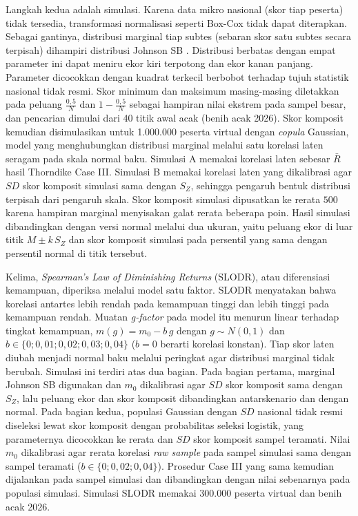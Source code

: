 Langkah kedua adalah simulasi. Karena data mikro nasional (skor tiap peserta) tidak tersedia, transformasi normalisasi seperti Box-Cox tidak dapat diterapkan. Sebagai gantinya, distribusi marginal tiap subtes (sebaran skor satu subtes secara terpisah) dihampiri distribusi Johnson SB \autocite{johnson1949}. Distribusi berbatas dengan empat parameter ini dapat meniru ekor kiri terpotong dan ekor kanan panjang. Parameter dicocokkan dengan kuadrat terkecil berbobot terhadap tujuh statistik nasional tidak resmi. Skor minimum dan maksimum masing-masing diletakkan pada peluang $\frac{0,5}{N}$ dan $1 - \frac{0,5}{N}$ sebagai hampiran nilai ekstrem pada sampel besar, dan pencarian dimulai dari 40 titik awal acak (benih acak 2026). Skor komposit kemudian disimulasikan untuk 1.000.000 peserta virtual dengan \textit{copula} Gaussian, model yang menghubungkan distribusi marginal melalui satu korelasi laten seragam pada skala normal baku. Simulasi A memakai korelasi laten sebesar $\bar{R}$ hasil Thorndike Case III. Simulasi B memakai korelasi laten yang dikalibrasi agar $SD$ skor komposit simulasi sama dengan $S_Z$, sehingga pengaruh bentuk distribusi terpisah dari pengaruh skala. Skor komposit simulasi dipusatkan ke rerata $500$ karena hampiran marginal menyisakan galat rerata beberapa poin. Hasil simulasi dibandingkan dengan versi normal melalui dua ukuran, yaitu peluang ekor di luar titik $M \pm k\,S_Z$ dan skor komposit simulasi pada persentil yang sama dengan persentil normal di titik tersebut.

Kelima, \textit{Spearman's Law of Diminishing Returns} (SLODR), atau diferensiasi kemampuan, diperiksa melalui model satu faktor. SLODR menyatakan bahwa korelasi antartes lebih rendah pada kemampuan tinggi dan lebih tinggi pada kemampuan rendah. Muatan \textit{g-factor} pada model itu menurun linear terhadap tingkat kemampuan, $m(g) = m_0 - b\,g$ dengan $g \sim N(0,1)$ dan $b \in \{0; 0,01; 0,02; 0,03; 0,04\}$ ($b = 0$ berarti korelasi konstan). Tiap skor laten diubah menjadi normal baku melalui peringkat agar distribusi marginal tidak berubah. Simulasi ini terdiri atas dua bagian. Pada bagian pertama, marginal Johnson SB digunakan dan $m_0$ dikalibrasi agar $SD$ skor komposit sama dengan $S_Z$, lalu peluang ekor dan skor komposit dibandingkan antarskenario dan dengan normal. Pada bagian kedua, populasi Gaussian dengan $SD$ nasional tidak resmi diseleksi lewat skor komposit dengan probabilitas seleksi logistik, yang parameternya dicocokkan ke rerata dan $SD$ skor komposit sampel teramati. Nilai $m_0$ dikalibrasi agar rerata korelasi \textit{raw sample} pada sampel simulasi sama dengan sampel teramati ($b \in \{0; 0,02; 0,04\}$). Prosedur Case III yang sama kemudian dijalankan pada sampel simulasi dan dibandingkan dengan nilai sebenarnya pada populasi simulasi. Simulasi SLODR memakai $300.000$ peserta virtual dan benih acak 2026.

